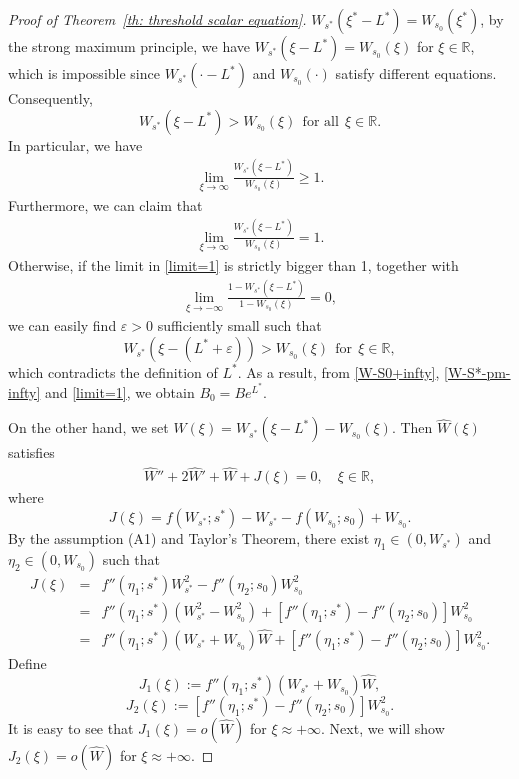 \documentclass[11pt,a4paper]{article}
\numberwithin{equation}{section}
\numberwithin{figure}{section}
\newcommand{\red}[1]{{\color{red}#1}}
\newcommand\bea{\begin{eqnarray}}
\newcommand\eea{\end{eqnarray}}
\newcommand\beaa{\begin{eqnarray*}}
\newcommand\eeaa{\end{eqnarray*}}
\begin{document}
\begin{proof}[Proof of Theorem~\ref{th: threshold scalar equation}]
$W_{s^*}(\xi^*-L^*)= W_{s_0}(\xi^*)$, by the strong maximum principle, we have $W_{s^*}(\xi-L^*)=W_{s_0}(\xi)$ for $\xi\in\mathbb{R}$,
which is impossible since $W_{s^*}(\cdot-L^*)$ and $W_{s_0}(\cdot)$ satisfy different equations. Consequently,
$$W_{s^*}(\xi-L^*)> W_{s_0}(\xi)\ \ \text{for all}\ \ \xi\in\mathbb{R}.$$
In particular, we have
\beaa
\lim_{\xi\to\infty}\frac{W_{s^*}(\xi-L^*)}{W_{s_0}(\xi)}\geq1.
\eeaa
Furthermore, we can claim that
\bea\label{limit=1}
\lim_{\xi\to\infty}\frac{W_{s^*}(\xi-L^*)}{W_{s_0}(\xi)}=1.
\eea
Otherwise, if the limit in \eqref{limit=1} is strictly bigger than 1, together with
\beaa%
\lim_{\xi\to-\infty}\frac{1-W_{s^*}(\xi-L^*)}{1-W_{s_0}(\xi)}=0,
\eeaa
we can easily  find $\varepsilon>0$ sufficiently small such that
$$W_{s^*}(\xi-(L^*+\varepsilon))> W_{s_0}(\xi)\ \ \text{for}\ \ \xi\in\mathbb{R},$$
which contradicts the definition of $L^*$.
As a result, from \eqref{W-S0+infty}, \eqref{W-S*-pm-infty} and \eqref{limit=1}, we obtain $B_0=Be^{L^*}$.


On the other hand, we set $\widehat{W}(\xi)=W_{s^*}(\xi-L^*)-W_{s_0}(\xi)$. Then $\widehat{W}(\xi)$ satisfies
\bea\label{W-hat-eq2}
\widehat{W}''+2\widehat{W}'+\widehat{W}+J(\xi)=0, \quad \xi\in\mathbb{R},
\eea
where
$$J(\xi)=f(W_{s^*};s^*)- W_{s^*}-f(W_{s_0};s_0)+ W_{s_0}.$$
By the assumption  (A1) and Taylor's Theorem, there exist $\eta_1\in(0, W_{s^*})$ and $\eta_2\in(0,W_{s_0})$ such that
\beaa
J(\xi)&=&f''(\eta_1;s^*)W^2_{s^*}-f''(\eta_2;s_0)W^2_{s_0}\\
      &=&f''(\eta_1;s^*)(W^2_{s^*}-W^2_{s_0})+[f''(\eta_1;s^*)-f''(\eta_2;s_0)]W^2_{s_0}\\
      &=&f''(\eta_1;s^*)(W_{s^*}+W_{s_0})\widehat{W}+[f''(\eta_1;s^*)-f''(\eta_2;s_0)]W^2_{s_0}.
\eeaa
Define 
$$J_1(\xi):=f''(\eta_1;s^*)(W_{s^*}+W_{s_0})\widehat{W},$$ 
$$J_2(\xi):=[f''(\eta_1;s^*)-f''(\eta_2;s_0)]W^2_{s_0}.$$
 It is easy to see that $J_1(\xi)=o(\widehat{W})$ for $\xi\approx+\infty$. Next, we will show $J_2(\xi)=o(\widehat{W})$ for $\xi\approx+\infty$.


\end{proof}
\end{document}
